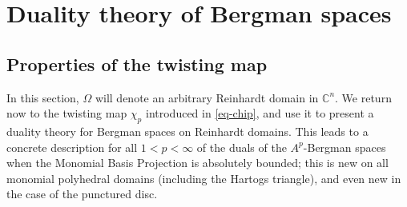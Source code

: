 \documentclass[letterpaper,11pt,reqno]{amsart}
\theoremstyle{plain}
\theoremstyle{definition}
\theoremstyle{remark}
\theoremstyle{remark}
\numberwithin{equation}{section}
\newcommand{\C}{{\mathbb C}}
\begin{document}

\section{Duality theory of Bergman spaces}\label{S:Duality}

\subsection{Properties of the twisting map}\label{SS:Props-of-twisting-map}
In this section, $\Omega$ will denote an arbitrary Reinhardt domain in $\C^n$.
We return now to the twisting map $\chi_p$ introduced in \eqref{eq-chip}, and use it to present a duality theory for Bergman spaces on Reinhardt domains.
This leads to a concrete description for all $1<p<\infty$ of the duals of the $A^p$-Bergman spaces when the Monomial Basis Projection is absolutely bounded; this is new on all monomial polyhedral domains (including the Hartogs triangle), and even new in the case of the punctured disc.
\end{document}
